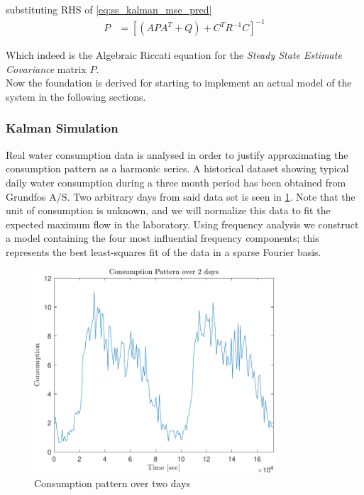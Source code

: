 substituting RHS of \cref{eq:ss_kalman_mse_pred}
\begin{align}
		P & = [({A}P{A}^T + {Q}) + {C}^T{R}^{-1}{C}]^{-1}  \label{eq:ss_kalman_udledning6}
\end{align}

Which indeed is the Algebraic Riccati equation for the \textit{Steady State Estimate Covariance} matrix $P$.\\
Now the foundation is derived for starting to implement an actual model of the system in the following sections.

\subsubsection{Kalman Simulation}\label{sec:kalman_imp}
Real water consumption data is analysed in order to justify approximating the consumption pattern as a harmonic series. A historical dataset showing typical daily water consumption during a three month period has been obtained from Grundfos A/S. Two arbitrary days from said data set is seen in \cref{fig:Consumptionpattern}. Note that the unit of consumption is unknown, and we will normalize this data to fit the expected maximum flow in the laboratory.  Using frequency analysis we construct a model containing the four most influential frequency components; this represents the best least-squares fit of the data in a sparse Fourier basis.

\begin{figure}[h!]
	\centering
	\includegraphics[width=0.8\textwidth]{Pictures/ConsumptionPattern.pdf}
	
	\caption{Consumption pattern over two days}
	\label{fig:Consumptionpattern}
\end{figure}

